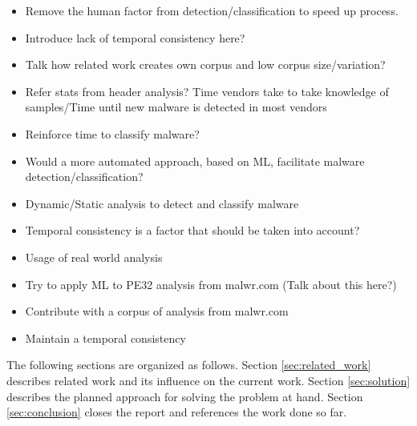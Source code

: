 \documentclass{llncs}
\begin{document}
%




\begin{itemize}
	\item Remove the human factor from detection/classification to speed up process.
	\item Introduce lack of temporal consistency here?
	\item Talk how related work creates own corpus and low corpus size/variation?
	\item Refer stats from header analysis? Time vendors take to take knowledge of samples/Time until new malware is detected in most vendors
	\item Reinforce time to classify malware?
\end{itemize}

\begin{itemize}
	\item Would a more automated approach, based on ML, facilitate malware detection/classification?
	\item Dynamic/Static analysis to detect and classify malware
	\item Temporal consistency is a factor that should be taken into account?
	
\end{itemize}
\begin{itemize}
	\item Usage of real world analysis
	\item Try to apply ML to PE32 analysis from malwr.com (Talk about this here?)
	\item Contribute with a corpus of analysis from malwr.com
	\item Maintain a temporal consistency
		
	
\end{itemize}
The following sections are organized as follows. Section \ref{sec:related_work} describes related work and its influence on the current work. Section \ref{sec:solution} describes the planned approach for solving the problem at hand. Section \ref{sec:conclusion} closes the report and references the work done so far.
\end{document}

